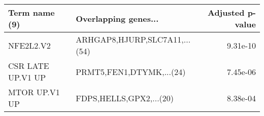 \begin{tabular}{llr}
\toprule
    Term name (9) &          Overlapping genes... &  Adjusted p-value \\
\midrule
        NFE2L2.V2 & ARHGAP8,HJURP,SLC7A11,...(54) &          9.31e-10 \\
CSR LATE UP.V1 UP &      PRMT5,FEN1,DTYMK,...(24) &          7.45e-06 \\
    MTOR UP.V1 UP &       FDPS,HELLS,GPX2,...(20) &          8.38e-04 \\
\bottomrule
\end{tabular}
